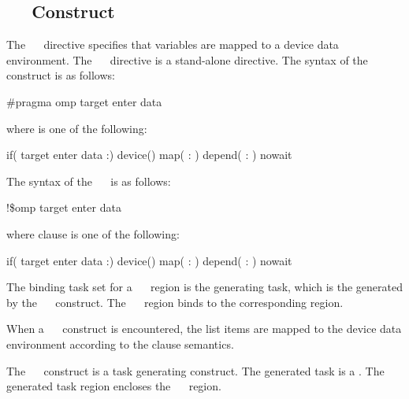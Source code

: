 \subsection{~~ Construct}
\label{subsec:target enter data Construct}
\summary
The ~~ directive specifies that variables are mapped to a device data environment. The ~~ directive is a stand-alone directive.
\syntax
\ccppspecificstart
The syntax of the ~~ construct is as follows:
\begin{boxedcode}
\#pragma omp target enter data 
\end{boxedcode}
where  is one of the following:
\begin{indentedcodelist}
if(\plc{[} target enter data :\plc{] scalar-expression})
device()
map(\plc{[ [map-type-modifier[,]] map-type} : \plc{] list})
depend( : )
nowait
\end{indentedcodelist}
\ccppspecificend
\fortranspecificstart
The syntax of the ~~ is as follows:
\begin{boxedcode}
!\$omp target enter data 
\end{boxedcode}
where clause is one of the following:
\begin{indentedcodelist}
if(\plc{[} target enter data :\plc{] scalar-logical-expression})
device()
map(\plc{[ [map-type-modifier[,]] map-type} : \plc{] list})
depend( : )
nowait
\end{indentedcodelist}
\fortranspecificend

\binding
The binding task set for a ~~ region is
the generating task, which is the  generated by the
~~ construct. The
~~ region binds to the corresponding
 region.

\descr
When a ~~ construct is encountered, the list items are mapped to the device data environment according to the  clause semantics.

The ~~ construct is a task generating construct.  The generated task is a .  The generated task region encloses the ~~ region.


